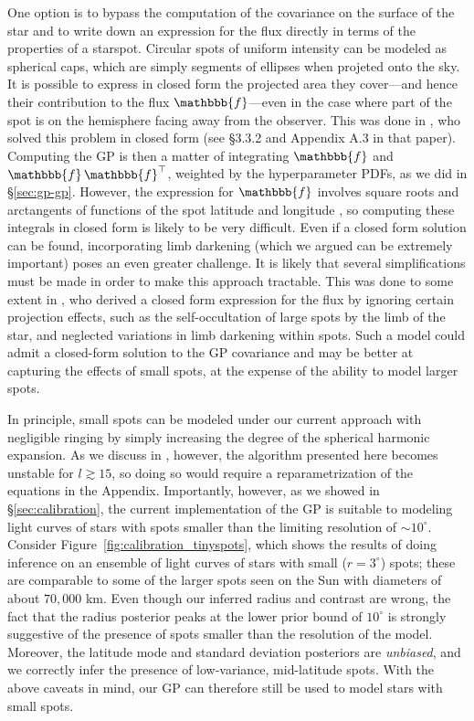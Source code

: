 \documentclass[modern,linenumbers]{aastex62}
\begin{document}
One option is to bypass the computation of the covariance on the surface of
the star and to write down an expression for the flux directly in terms of
the properties of a starspot. Circular spots of uniform intensity can be
modeled as spherical caps, which are simply segments of ellipses when
projeted onto the sky. It is possible to express in closed form the projected area
they cover---and hence their contribution to the flux $\mathbbb{f}$---even in the case
where part of the spot is on the hemisphere facing away from the observer.
This was done in \citet{Luger2017}, who solved this problem in closed form
(see \S3.3.2 and Appendix A.3 in that paper). Computing the GP is then a matter of
integrating $\mathbbb{f}$ and $\mathbbb{f}\,\mathbbb{f}^\top$, weighted by
the hyperparameter PDFs, as we did in \S\ref{sec:gp-gp}.
However, the expression for
$\mathbbb{f}$ involves square roots and arctangents of functions of the spot
latitude and longitude
\citep[see Equation~40 in][]{Luger2017},
so computing these integrals in closed form is
likely to be very difficult. Even if a closed form solution can be found,
incorporating limb darkening (which we argued can be extremely important)
poses an even greater challenge. It is likely that several simplifications
must be made in order to make this approach tractable. This was done to some
extent in \citet{Morris2020}, who derived a closed form expression for the flux by
ignoring certain projection effects, such
as the self-occultation of large spots by the limb of the star, and neglected
variations in limb darkening within spots. Such a model could admit a closed-form
solution to the GP covariance and may be better at capturing the effects
of small spots, at the expense of the ability to model larger spots.

In principle, small spots can be modeled under our current
approach with negligible ringing by simply
increasing the degree of the spherical harmonic expansion. As we discuss in
\citep{JOSSPaper}, however, the algorithm presented here becomes
unstable for $l \gtrsim 15$, so doing so would require a reparametrization
of the equations in the Appendix. Importantly, however, as we showed in
\S\ref{sec:calibration}, the current implementation of the GP is suitable
to modeling light curves of stars with spots smaller than the limiting
resolution of $\sim 10^\circ$. Consider Figure~\ref{fig:calibration_tinyspots},
which shows the results of doing inference on an ensemble of light curves
of stars with small ($r = 3^\circ$) spots; these are comparable to some of
the larger spots seen on the Sun with diameters of about $70,000$ km.
Even though our inferred radius and contrast are wrong, the fact that the radius
posterior peaks
at the lower prior bound of $10^\circ$ is strongly suggestive of the presence
of spots smaller than the resolution of the model. Moreover, the
latitude mode and standard deviation posteriors are \emph{unbiased}, and we
correctly infer the presence of low-variance, mid-latitude spots.
With the above caveats in mind, our GP can therefore still be used to model
stars with small spots.
\end{document}
